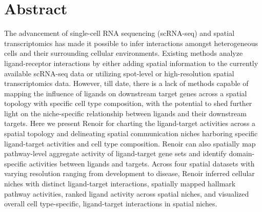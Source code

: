 \section*{Abstract}
The advancement of single-cell RNA sequencing (scRNA-seq) and spatial transcriptomics has made it possible to infer interactions amongst heterogeneous cells and their surrounding cellular environments. Existing methods analyze ligand-receptor interactions by either adding spatial information to the currently available scRNA-seq data or utilizing spot-level or high-resolution spatial transcriptomics data. However, till date, there is a lack of methods capable of mapping the influence of ligands on downstream target genes across a spatial topology with specific cell type composition, with the potential to shed further light on the niche-specific relationship between ligands and their downstream targets. Here we present Renoir for charting the ligand-target activities across a spatial topology and delineating spatial communication niches harboring specific ligand-target activities and cell type composition. Renoir can also spatially map pathway-level aggregate activity of ligand-target gene sets and identify domain-specific activities between ligands and targets. Across four spatial datasets with varying resolution ranging from development to disease, Renoir inferred cellular niches with distinct ligand-target interactions, spatially mapped hallmark pathway activities, ranked ligand activity across spatial niches, and visualized overall cell type-specific, ligand-target interactions in spatial niches.